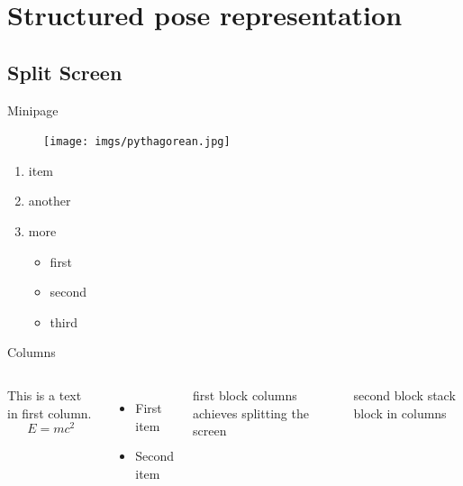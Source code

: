 \section{Structured pose representation}

\subsection{Split Screen}

\begin{frame}{Minipage}
    \begin{minipage}{0.5\linewidth}
        \begin{figure}[h]
            \texttt{[image: imgs/pythagorean.jpg]}
        \end{figure}
    \end{minipage}%
    \hfill
    \begin{minipage}{0.4\linewidth}
        \begin{enumerate}
            \item item
            \item another
            \item more
            \begin{itemize}
                \item first
                \item second
                \item third
            \end{itemize}
        \end{enumerate}
    \end{minipage}
\end{frame}

\begin{frame}{Columns}
    \begin{columns}
        This is a text in first column.
        $$E=mc^2$$
        \begin{itemize}
        \item First item
        \item Second item
        \end{itemize}
        
        \begin{block}{first block}
            columns achieves splitting the screen
        \end{block}
        \begin{block}{second block}
            stack block in columns
        \end{block}
        
    \end{columns}
\end{frame}

